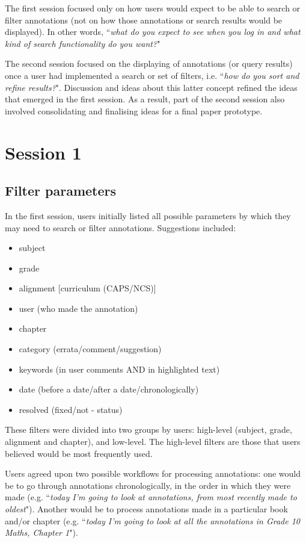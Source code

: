 The first session focused only on how users would expect to be able to search or filter annotations (not on how those annotations or search results would be displayed). In other words, ``\textit{what do you expect to see when you log in and what kind of search functionality do you want?}"

The second session focused on the displaying of annotations (or query results) once a user had implemented a search or set of filters, i.e. ``\textit{how do you sort and refine results?}". Discussion and ideas about this latter concept refined the ideas that emerged in the first session. As a result, part of the second session also involved consolidating and finalising ideas for a final paper prototype.

\section{Session 1}

\subsection{Filter parameters}
In the first session, users initially listed all possible parameters by which they may need to search or filter annotations. Suggestions included:
\begin{itemize}
\item subject
\item grade
\item alignment [curriculum (CAPS/NCS)]
\item user (who made the annotation)
\item chapter
\item category (errata/comment/suggestion)
\item keywords (in user comments AND in highlighted text)
\item date (before a date/after a date/chronologically)
\item resolved (fixed/not - status)
\end{itemize}

These filters were divided into two groups by users: high-level (subject, grade, alignment and chapter), and low-level. The high-level filters are those that users believed would be most frequently used. 

Users agreed upon two possible workflows for processing annotations: one would be to go through annotations chronologically, in the order in which they were made (e.g. ``\textit{today I'm going to look at annotations, from most recently made to oldest}"). Another would be to process annotations made in a particular book and/or chapter (e.g. ``\textit{today I'm going to look at all the annotations in Grade 10 Maths, Chapter 1}").

